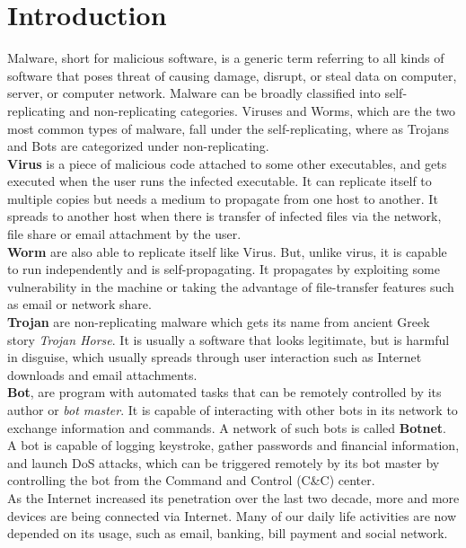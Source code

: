 \chapter{Introduction}\label{chapter:introduction}
Malware, short for malicious software, is a generic term referring to all kinds of software that poses threat of causing damage, disrupt, or steal data on computer, server, or computer network.
Malware can be broadly classified into self-replicating and non-replicating categories.
Viruses and Worms, which are the two most common types of malware, fall under the self-replicating, where as Trojans and Bots are categorized under non-replicating.\\
\textbf{Virus} is a piece of malicious code attached to some other executables, and gets executed when the user runs the infected executable.
It can replicate itself to multiple copies but needs a medium to propagate from one host to another.
It spreads to another host when there is transfer of infected files via the network, file share or email attachment by the user.\\
\textbf{Worm} are also able to replicate itself like Virus.
But, unlike virus, it is capable to run independently and is self-propagating.
It propagates by exploiting some vulnerability in the machine or taking the advantage of file-transfer features such as email or network share.\\
\textbf{Trojan} are non-replicating malware which gets its name from ancient Greek story \textit{Trojan Horse}.
It is usually a software that looks legitimate, but is harmful in disguise, which usually spreads through user interaction such as Internet downloads and email attachments.\\
\textbf{Bot}, are program with automated tasks that can be remotely controlled by its author or \emph{bot master}.
It is capable of interacting with other bots in its network to exchange information and commands.
A network of such bots is called \textbf{Botnet}.
A bot is capable of logging keystroke, gather passwords and financial information, and launch DoS attacks, which can be triggered remotely by its bot master by controlling the bot from the Command and Control (C\&C) center.\\
As the Internet increased its penetration over the last two decade, more and more devices are being connected via Internet.
Many of our daily life activities are now depended on its usage, such as email, banking, bill payment and social network.
